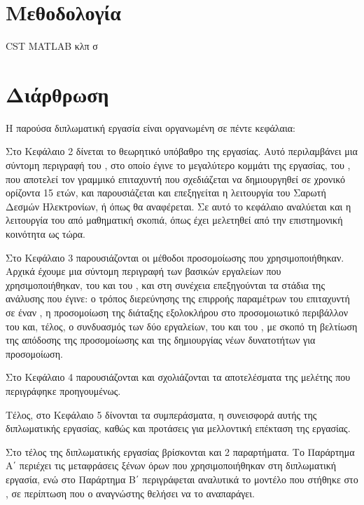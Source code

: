 \section{Μεθοδολογία}

CST MATLAB κλπ
σ

\section{Διάρθρωση}
Η παρούσα διπλωματική εργασία είναι οργανωμένη σε πέντε κεφάλαια:

Στο Κεφάλαιο 2 δίνεται το θεωρητικό υπόβαθρο της εργασίας. 
Αυτό περιλαμβάνει μια σύντομη περιγραφή του , στο οποίο έγινε το μεγαλύτερο κομμάτι της εργασίας, του , που αποτελεί τον γραμμικό επιταχυντή που σχεδιάζεται να δημιουργηθεί σε χρονικό ορίζοντα 15 ετών, και παρουσιάζεται και επεξηγείται η λειτουργία του Σαρωτή Δεσμών Ηλεκτρονίων, ή  όπως θα αναφέρεται.
Σε αυτό το κεφάλαιο αναλύεται και η λειτουργία του  από μαθηματική σκοπιά, όπως έχει μελετηθεί από την επιστημονική κοινότητα ως τώρα.

Στο Κεφάλαιο 3 παρουσιάζονται οι μέθοδοι προσομοίωσης που χρησιμοποιήθηκαν.
Αρχικά έχουμε μια σύντομη περιγραφή των βασικών εργαλείων που χρησιμοποιήθηκαν, του  και του , και στη συνέχεια επεξηγούνται τα στάδια της ανάλυσης που έγινε: ο τρόπος διερεύνησης της επιρροής παραμέτρων του επιταχυντή σε έναν , η προσομοίωση της διάταξης εξολοκλήρου στο προσομοιωτικό περιβάλλον του  και, τέλος, ο συνδυασμός των δύο εργαλείων, του  και του , με σκοπό τη βελτίωση της απόδοσης της προσομοίωσης και της δημιουργίας νέων δυνατοτήτων για προσομοίωση.

Στο Κεφάλαιο 4 παρουσιάζονται και σχολιάζονται τα αποτελέσματα της μελέτης που περιγράφηκε προηγουμένως.

Τέλος, στο Κεφάλαιο 5 δίνονται τα συμπεράσματα, η συνεισφορά αυτής της
διπλωματικής εργασίας, καθώς και προτάσεις για μελλοντική επέκταση της εργασίας.

Στο τέλος της διπλωματικής εργασίας βρίσκονται και 2 παραρτήματα.
Το Παράρτημα Α΄ περιέχει τις μεταφράσεις ξένων όρων που χρησιμοποιήθηκαν στη διπλωματική εργασία, ενώ στο Παράρτημα Β΄ περιγράφεται αναλυτικά το μοντέλο που στήθηκε στο , σε περίπτωση που ο αναγνώστης θελήσει να το αναπαράγει.